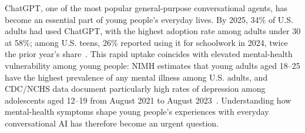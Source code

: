 \documentclass[letterpaper]{article}
\begin{document}


ChatGPT, one of the most popular general-purpose conversational agents, has become an essential part of young people's everyday lives. By 2025, 34\% of U.S. adults had used ChatGPT, with the highest adoption rate among adults under 30 at 58\%; among U.S. teens, 26\% reported using it for schoolwork in 2024, twice the prior year's share~\citep{sidoti2025adults,sidoti2025teens}. This rapid uptake coincides with elevated mental-health vulnerability among young people: NIMH estimates that young adults aged 18--25 have the highest prevalence of any mental illness among U.S. adults, and CDC/NCHS data document particularly high rates of depression among adolescents aged 12--19 from August 2021 to August 2023~\citep{nimhMentalIllness,brody2025depression}. Understanding how mental-health symptoms shape young people's experiences with everyday conversational AI has therefore become an urgent question.
\end{document}
